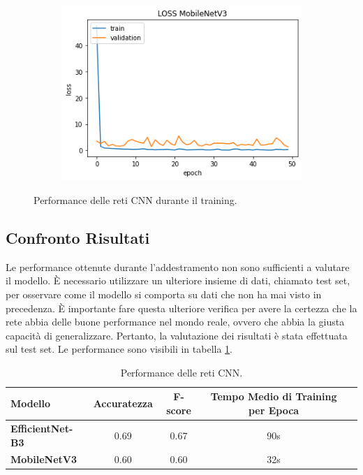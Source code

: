 \documentclass[11pt]{report}
\begin{document}
\begin{figure}[h]
\begin{subfigure}[t]{.45\textwidth}
	\end{subfigure}
	\quad
	\begin{subfigure}[t]{.45\textwidth}
	\centering
    \includegraphics[scale = 0.5]{img/Loss-mobile.png}
	\end{subfigure}
	\quad
\caption{Performance delle reti CNN durante il training.}
\label{fig:train-CNN}
\end{figure}


\subsection{Confronto Risultati}

Le performance ottenute durante l'addestramento non sono sufficienti a valutare il modello. È necessario utilizzare un ulteriore insieme di dati, chiamato test set, per osservare come il modello si comporta su dati che non ha mai visto in precedenza. È importante fare questa ulteriore verifica per avere la certezza che la rete abbia delle buone performance nel mondo reale, ovvero che abbia la giusta capacità di generalizzare. Pertanto, la valutazione dei risultati è stata effettuata sul test set. Le performance sono visibili in tabella \ref{tab2}.

\newpage

\begin{table}[h]
\caption{Performance delle reti CNN.}
\label{tab2}
\centering
\begin{tabular}{|l|c|c|c|c|}
\hline
\textbf{Modello} &  \textbf{Accuratezza} & \textbf{F-score}  & \textbf{Tempo Medio di Training per Epoca}\\
\hline
\textbf{EfficientNet-B3} &  0.69  & 0.67 & 90s\\
\textbf{MobileNetV3} &  0.60 & 0.60 & 32s\\
\hline
\end{tabular}
\end{table}
\end{document}
